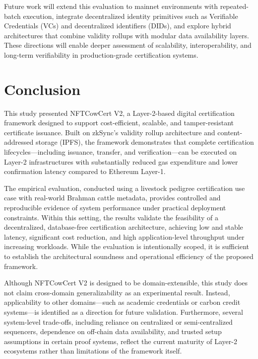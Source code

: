 \documentclass[pdflatex,sn-mathphys-num]{sn-jnl}
\begin{document}
Future work will extend this evaluation to mainnet environments with repeated-batch execution, integrate decentralized identity primitives such as Verifiable Credentials (VCs) and decentralized identifiers (DIDs), and explore hybrid architectures that combine validity rollups with modular data availability layers. These directions will enable deeper assessment of scalability, interoperability, and long-term verifiability in production-grade certification systems.

\section{Conclusion}

This study presented NFTCowCert V2, a Layer-2-based digital certification framework designed to support cost-efficient, scalable, and tamper-resistant certificate issuance. Built on zkSync’s validity rollup architecture and content-addressed storage (IPFS), the framework demonstrates that complete certification lifecycles—including issuance, transfer, and verification—can be executed on Layer-2 infrastructures with substantially reduced gas expenditure and lower confirmation latency compared to Ethereum Layer-1.

The empirical evaluation, conducted using a livestock pedigree certification use case with real-world Brahman cattle metadata, provides controlled and reproducible evidence of system performance under practical deployment constraints. Within this setting, the results validate the feasibility of a decentralized, database-free certification architecture, achieving low and stable latency, significant cost reduction, and high application-level throughput under increasing workloads. While the evaluation is intentionally scoped, it is sufficient to establish the architectural soundness and operational efficiency of the proposed framework.

Although NFTCowCert V2 is designed to be domain-extensible, this study does not claim cross-domain generalizability as an experimental result. Instead, applicability to other domains—such as academic credentials or carbon credit systems—is identified as a direction for future validation. Furthermore, several system-level trade-offs, including reliance on centralized or semi-centralized sequencers, dependence on off-chain data availability, and trusted setup assumptions in certain proof systems, reflect the current maturity of Layer-2 ecosystems rather than limitations of the framework itself.
\end{document}

